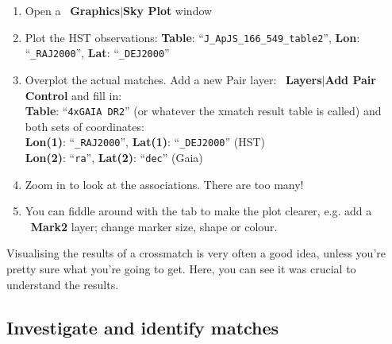 \documentclass{article}
\newcommand{\buttimg}[1]
           {\mbox{\vtop{\vskip-2ex\hbox{\texttt{[image: \#1]}}}}}
\newcommand{\winfig}[2]
           {\vspace*{-0.5cm}
            \hspace*{0.5cm}\mbox{\vtop{\hbox{\texttt{[image: \#2]}}}}}
\newcommand{\lab}[1]{{\bf #1}}
\newcommand{\ma}[2]{\buttimg{#1}~\lab{#2}}
\newcommand{\mb}[3]{\buttimg{#1}~\lab{#2}$\mid$\lab{#3}}
\newcommand{\entry}[2]{\lab{#1}: ``{\tt #2}''}
\begin{document}
\begin{minipage}[t]{11cm}
  \raggedright
  \begin{enumerate}
  \item Open a \mb{skyplot_button.png}{Graphics}{Sky Plot} window
  \item Plot the HST observations:
        \entry{Table}{J\_ApJS\_166\_549\_table2},
        \entry{Lon}{\_RAJ2000}, \entry{Lat}{\_DEJ2000}
  \item Overplot the actual matches.
        Add a new {Pair} layer:
        \mb{pairs_button.png}{Layers}{Add Pair Control} and fill in:\\
        \entry{Table}{4xGAIA DR2}
              (or whatever the xmatch result table is called)
        and both sets of coordinates: \\
        \entry{Lon(1)}{\_RAJ2000}, \entry{Lat(1)}{\_DEJ2000} (HST) \\
        \entry{Lon(2)}{ra}, \entry{Lat(2)}{dec} (Gaia)
  \item Zoom in to look at the associations.  There are too many!
  \item You can fiddle around with the \label{Form} tab to make the
        plot clearer, e.g. add a \ma{mark2_button.png}{Mark2} layer;
        change marker size, shape or colour.
  \end{enumerate}
  Visualising the results of a crossmatch is very often a good
  idea, unless you're pretty sure what you're going to get.
  Here, you can see it was crucial to understand the results.
\end{minipage}
\begin{minipage}[t]{8cm}
  \vspace*{-0.5cm}
  \winfig{width=8cm}{n3_allmatch.png}
\end{minipage}

\subsection{Investigate and identify matches}
\end{document}
